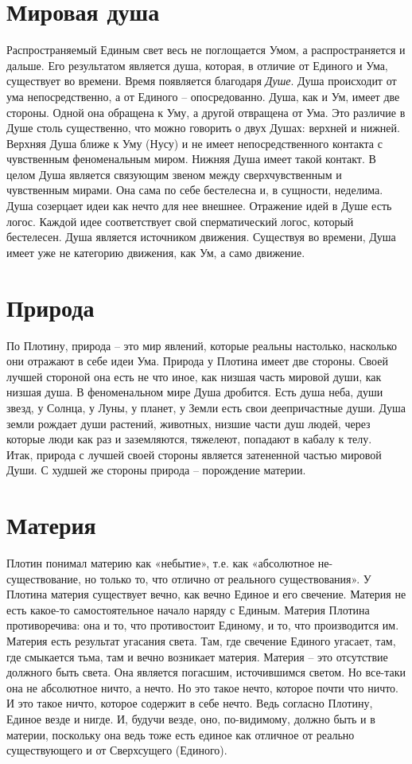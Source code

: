 \documentclass[a4paper,12pt]{article}
\begin{document}
\part{Мировая душа}
Распространяемый Единым свет весь не поглощается Умом, а распространяется и дальше. Его результатом является душа, которая, в отличие от Единого и Ума, существует во времени. Время появляется благодаря \textit{Душе}. Душа происходит от ума непосредственно, а от Единого – опосредованно. Душа, как и Ум, имеет две стороны. Одной она обращена к Уму, а другой отвращена от Ума. Это различие в Душе столь существенно, что можно говорить о двух Душах: верхней и нижней. Верхняя Душа ближе к Уму (Нусу) и не имеет непосредственного контакта с чувственным феноменальным миром. Нижняя Душа имеет такой контакт. В целом Душа является связующим звеном между сверхчувственным и чувственным мирами. Она сама по себе бестелесна и, в сущности, неделима. Душа созерцает идеи как нечто для нее внешнее. Отражение идей в Душе есть логос. Каждой идее соответствует свой сперматический логос, который бестелесен.
Душа является источником движения. Существуя во времени, Душа имеет уже не категорию движения, как Ум, а само движение.
\part{Природа}
По Плотину, природа – это мир явлений, которые реальны настолько, насколько они отражают в себе идеи Ума. Природа у Плотина имеет две стороны. Своей лучшей стороной она есть не что иное, как низшая часть мировой души, как низшая душа.
В феноменальном мире Душа дробится. Есть душа неба, души звезд, у Солнца, у Луны, у планет, у Земли есть свои деепричастные души. Душа земли рождает души растений, животных, низшие части душ людей, через которые люди как раз и заземляются, тяжелеют, попадают в кабалу к телу.\\

Итак, природа с лучшей своей стороны является затененной частью мировой Души. С худшей же стороны природа – порождение материи.
\newpage
\part{Материя}
Плотин понимал материю как «небытие», т.е. как «абсолютное  не-существование, но только то, что отлично от реального существования».
У Плотина материя существует вечно, как вечно Единое и его свечение. Материя не есть какое-то самостоятельное начало наряду с Единым. Материя Плотина противоречива: она и то, что противостоит Единому, и то, что производится им. Материя есть результат угасания света. Там, где свечение Единого угасает, там, где смыкается тьма, там и вечно возникает материя. Материя – это отсутствие должного быть света. Она является погасшим, источившимся светом. Но все-таки она не абсолютное ничто, а нечто. Но это такое нечто, которое почти что ничто. И это такое ничто, которое содержит в себе нечто. Ведь согласно Плотину, Единое везде и нигде. И, будучи везде, оно, по-видимому, должно быть и в материи, поскольку она ведь тоже есть единое как отличное от реально существующего и от Сверхсущего (Единого).\\
 
\end{document}
